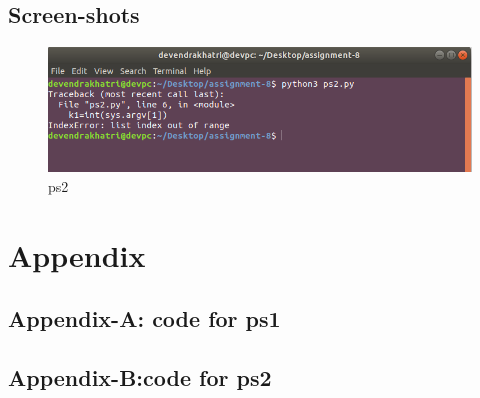 \documentclass[a4paper,12pt]{article}
\begin{document}
\subsection{Screen-shots}
\begin{figure}
\includegraphics[scale=0.4]{ps2o.png}
\caption{ps2}
\label{fig:fig2}
\end{figure}
\newpage

\section{Appendix}
\subsection{Appendix-A: code for ps1}



\newpage
\subsection{Appendix-B:code for ps2}




\newpage
\newpage
\nocite{*}


\end{document}
